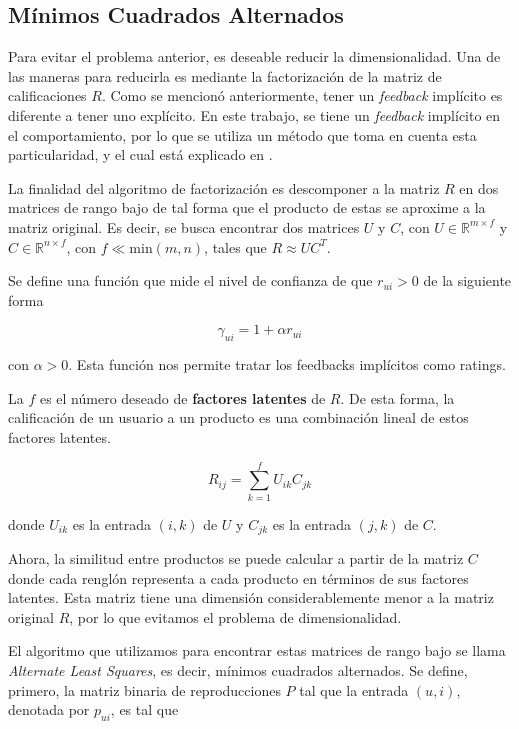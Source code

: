 \documentclass[conference]{IEEEtran}
\begin{document}
\subsection{Mínimos Cuadrados Alternados}

Para evitar el problema anterior, es deseable reducir la dimensionalidad. Una de las maneras para reducirla es mediante la factorización de la matriz de calificaciones $R$. Como se mencionó anteriormente, tener un \textit{feedback} implícito es diferente a tener uno explícito. En este trabajo, se tiene un \textit{feedback} implícito en el comportamiento, por lo que se utiliza un método que toma en cuenta esta particularidad, y el cual está explicado en \cite{hu2008collaborative}. 

La finalidad del algoritmo de factorización es descomponer a la matriz $R$ en dos matrices de rango bajo de tal forma que el producto de estas se aproxime a la matriz original. Es decir, se busca encontrar dos matrices $U$ y $C$, con $U \in \mathbb{R}^{m \times f}$ y $C \in \mathbb{R}^{n \times f}$, con $f \ll \mathrm{min}(m, n)$, tales que $R \approx UC^T$.

Se define una función que mide el nivel de confianza de que $r_{ui} > 0$ de la siguiente forma

\[
    \gamma_{ui} = 1 + \alpha r_{ui}
\]

con $\alpha > 0$. Esta función nos permite tratar los feedbacks implícitos como ratings.

La $f$ es el número deseado de \textbf{factores latentes} de $R$. De esta forma, la calificación de un usuario a un producto es una combinación lineal de estos factores latentes.

\[
    R_{ij} = \sum_{k = 1}^f U_{ik} C_{jk}
\]

donde $U_{ik}$ es la entrada $(i, k)$ de $U$ y $C_{jk}$ es la entrada $(j, k)$ de $C$.

Ahora, la similitud entre productos se puede calcular a partir de la matriz $C$ donde cada renglón representa a cada producto en términos de sus factores latentes. Esta matriz tiene una dimensión considerablemente menor a la matriz original $R$, por lo que evitamos el problema de dimensionalidad.

El algoritmo que utilizamos para encontrar estas matrices de rango bajo se llama \textit{Alternate Least Squares}, es decir, mínimos cuadrados alternados. 
Se define, primero, la matriz binaria de reproducciones $P$ tal que la entrada $(u, i)$, denotada por $p_{ui}$, es tal que 
\end{document}
